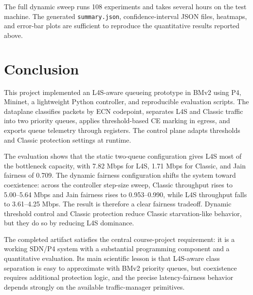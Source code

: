 \documentclass[10pt]{article}
\begin{document}
The full dynamic sweep runs 108 experiments and takes several hours on the test machine. The generated \texttt{summary.json}, confidence-interval JSON files, heatmaps, and error-bar plots are sufficient to reproduce the quantitative results reported above.

\section{Conclusion}

This project implemented an L4S-aware queueing prototype in BMv2 using P4, Mininet, a lightweight Python controller, and reproducible evaluation scripts. The dataplane classifies packets by ECN codepoint, separates L4S and Classic traffic into two priority queues, applies threshold-based CE marking in egress, and exports queue telemetry through registers. The control plane adapts thresholds and Classic protection settings at runtime.

The evaluation shows that the static two-queue configuration gives L4S most of the bottleneck capacity, with 7.82 Mbps for L4S, 1.71 Mbps for Classic, and Jain fairness of 0.709. The dynamic fairness configuration shifts the system toward coexistence: across the controller step-size sweep, Classic throughput rises to 5.00--5.64 Mbps and Jain fairness rises to 0.953--0.990, while L4S throughput falls to 3.61--4.25 Mbps. The result is therefore a clear fairness tradeoff. Dynamic threshold control and Classic protection reduce Classic starvation-like behavior, but they do so by reducing L4S dominance.

The completed artifact satisfies the central course-project requirement: it is a working SDN/P4 system with a substantial programming component and a quantitative evaluation. Its main scientific lesson is that L4S-aware class separation is easy to approximate with BMv2 priority queues, but coexistence requires additional protection logic, and the precise latency-fairness behavior depends strongly on the available traffic-manager primitives.
\end{document}
